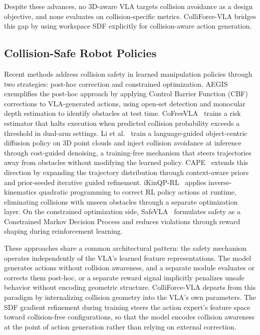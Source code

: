 Despite these advances, no 3D-aware VLA targets collision avoidance as a design objective, and none evaluates on collision-specific metrics. ColliForce-VLA bridges this gap by using workspace SDF explicitly for collision-aware action generation.

\subsection{Collision-Safe Robot Policies}

Recent methods address collision safety in learned manipulation policies through two strategies: post-hoc correction and constrained optimization. AEGIS~\cite{hu2025vlsa} exemplifies the post-hoc approach by applying Control Barrier Function (CBF) corrections to VLA-generated actions, using open-set detection and monocular depth estimation to identify obstacles at test time. CoFreeVLA~\cite{cofreeevla2026} trains a risk estimator that halts execution when predicted collision probability exceeds a threshold in dual-arm settings. Li et al.~\cite{li2024langguided} train a language-guided object-centric diffusion policy on 3D point clouds and inject collision avoidance at inference through cost-guided denoising, a training-free mechanism that steers trajectories away from obstacles without modifying the learned policy. CAPE~\cite{yang2025cape} extends this direction by expanding the trajectory distribution through context-aware priors and prior-seeded iterative guided refinement. iKinQP-RL~\cite{spalter2024ikinqp} applies inverse-kinematics quadratic programming to correct RL policy actions at runtime, eliminating collisions with unseen obstacles through a separate optimization layer. On the constrained optimization side, SafeVLA~\cite{zhang2025safevla} formulates safety as a Constrained Markov Decision Process and reduces violations through reward shaping during reinforcement learning.

These approaches share a common architectural pattern: the safety mechanism operates independently of the VLA's learned feature representations. The model generates actions without collision awareness, and a separate module evaluates or corrects them post-hoc, or a separate reward signal implicitly penalizes unsafe behavior without encoding geometric structure. ColliForce-VLA departs from this paradigm by internalizing collision geometry into the VLA's own parameters. The SDF gradient refinement during training steers the action expert's feature space toward collision-free configurations, so that the model encodes collision awareness at the point of action generation rather than relying on external correction.


